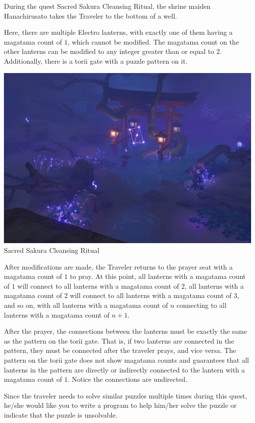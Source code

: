 During the quest Sacred Sakura Cleansing Ritual, the shrine maiden Hanachirusato takes the Traveler to the bottom of a well.

Here, there are multiple Electro lanterns, with exactly one of them having a magatama count of $1$, which cannot be modified. The magatama count on the other lanterns can be modified to any integer greater than or equal to $2$. Additionally, there is a torii gate with a puzzle pattern on it.

\begin{center}
  \includegraphics[scale=0.25]{puzzle.jpg} \\
  \small{Sacred Sakura Cleansing Ritual}
\end{center}

After modifications are made, the Traveler returns to the prayer seat with a magatama count of $1$ to pray. At this point, all lanterns with a magatama count of $1$ will connect to all lanterns with a magatama count of $2$, all lanterns with a magatama count of $2$ will connect to all lanterns with a magatama count of $3$, and so on, with all lanterns with a magatama count of $n$ connecting to all lanterns with a magatama count of $n + 1$.

After the prayer, the connections between the lanterns must be exactly the same as the pattern on the torii gate. That is, if two lanterns are connected in the pattern, they must be connected after the traveler prays, and vice versa. The pattern on the torii gate does not show magatama counts and guarantees that all lanterns in the pattern are directly or indirectly connected to the lantern with a magatama count of $1$. Notice the connections are undirected.

Since the traveler needs to solve similar puzzles multiple times during this quest, he/she would like you to write a program to help him/her solve the puzzle or indicate that the puzzle is unsolvable.